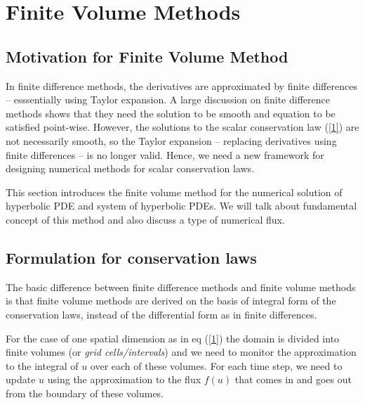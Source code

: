 \section{Finite Volume Methods}
\subsection{Motivation for Finite Volume Method}
In finite difference methods, the derivatives are approximated by finite differences -- esssentially using Taylor expansion. A large discussion on finite difference  methods shows that they need the solution to be smooth and equation to be satisfied point-wise. However, the solutions to the scalar conservation law (\ref{1}) are not necessarily smooth, so the Taylor expansion -- replacing derivatives using finite differences -- is no longer valid. Hence, we need a new framework for designing numerical methods for scalar conservation laws.

This section introduces the finite volume method for the numerical solution of hyperbolic PDE and system of hyperbolic PDEs. We will talk about fundamental concept of this method and also discuss a type of numerical flux. 

\subsection{Formulation for conservation laws}
The basic difference between finite difference methods and finite volume methods is that finite volume methods are derived on the basis of integral form of the conservation laws, instead of the differential form as in finite differences.

For the case of one spatial dimension as in eq (\ref{1}) the domain is divided into finite volumes (or \textit{grid cells/intervals}) and we need to monitor the approximation to the integral of $u$ over each of these volumes. For each time step, we need to update $u$ using the approximation to the flux $f(u)$ that comes in and goes out from the boundary of these volumes.

